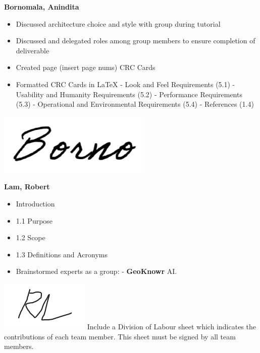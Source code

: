 \documentclass[]{article}
\begin{document}
\textbf{Bornomala, Anindita}
\begin{itemize}
        \item Discussed architecture choice and style with group during tutorial
        \item Discussed and delegated roles among group members to ensure completion of deliverable
        \item Created page (insert page nums) CRC Cards
		\item Formatted CRC Cards in LaTeX
            \subitem - Look and Feel Requirements (5.1)
            \subitem - Usability and Humanity Requirements (5.2)
            \subitem - Performance Requirements (5.3)
            \subitem - Operational and Environmental Requirements (5.4)
            \subitem - References (1.4)
\end{itemize}
\includegraphics[scale=0.50]{bornosignature.png}

\textbf{Lam, Robert}
\begin{itemize}
        \item Introduction
        \item 1.1 Purpose
        \item 1.2 Scope
        \item 1.3 Definitions and Acronyms
        \item Brainstormed experts as a group:
		    \subitem - \textbf{GeoKnowr} AI.
\end{itemize}
\includegraphics[scale=1]{robertsignature.png}
Include a Division of Labour sheet which indicates the contributions of each team member. This sheet must be signed by all team members.
\end{document}
